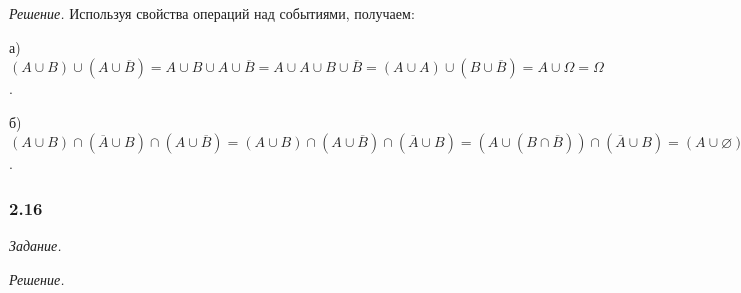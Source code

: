 \documentclass{book}
\begin{document}
\textit{Решение.} Используя свойства операций над событиями, получаем:

а) $\left(A\cup B\right)\cup\left(A\cup\overline{B}\right)=A\cup B\cup A\cup\overline{B}=A\cup A\cup B\cup\overline{B}=\left(A\cup A\right)\cup\left(B\cup\overline{B}\right)=A\cup\Omega=\Omega$.

б) $\left(A\cup B\right)\cap\left(\overline{A}\cup B\right)\cap\left(A\cup\overline{B}\right)=\left(A\cup B\right)\cap\left(A\cup\overline{B}\right)\cap\left(\overline{A}\cup B\right)=\left(A\cup\left(B\cap\overline{B}\right)\right)\cap\left(\overline{A}\cup B\right)=\left(A\cup\varnothing\right)\cap\left(\overline{A}\cup B\right)=A\cap\left(\overline{A}\cup B\right)=\left(A\cap\overline{A}\right)\cup\left(A\cap B\right)=\varnothing\cup\left(A\cap B\right)=A\cap B$.

\subsubsection*{2.16}

\textit{Задание.} 

\textit{Решение.}
\end{document}
